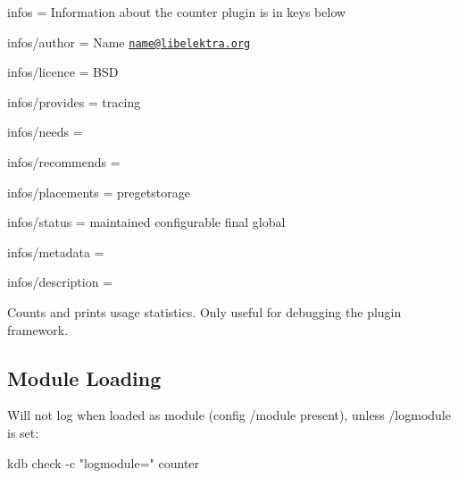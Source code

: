
\begin{DoxyItemize}
\item infos = Information about the counter plugin is in keys below
\item infos/author = Name \href{mailto:name@libelektra.org}{\tt name@libelektra.\+org}
\item infos/licence = B\+S\+D
\item infos/provides = tracing
\item infos/needs =
\item infos/recommends =
\item infos/placements = pregetstorage
\item infos/status = maintained configurable final global
\item infos/metadata =
\item infos/description =
\end{DoxyItemize}

Counts and prints usage statistics. Only useful for debugging the plugin framework.

\subsection*{Module Loading}

Will not log when loaded as module (config {\ttfamily /module} present), unless {\ttfamily /logmodule} is set\+: \begin{DoxyVerb}kdb check -c "logmodule=" counter\end{DoxyVerb}
 